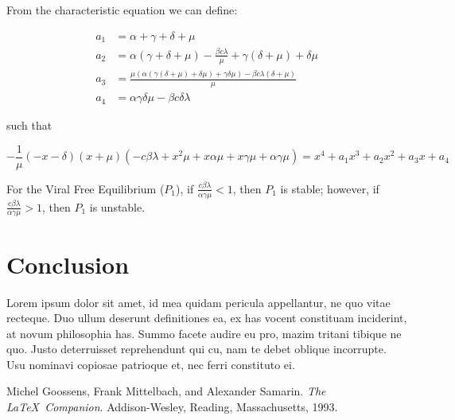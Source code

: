 \documentclass{article}
\begin{document}
From the characteristic equation we can define:

\begin{equation}
	\begin{split}
		a_{1} &= \alpha + \gamma + \delta + \mu \\
		a_{2} &= \alpha (\gamma + \delta + \mu) - \frac{\beta c \lambda}{\mu} + \gamma (\delta + \mu) + \delta \mu \\
		a_{3} &= \frac{\mu (\alpha (\gamma (\delta + \mu) + \delta \mu) + \gamma \delta \mu ) - \beta c \lambda (\delta + \mu)}{\mu} \\
		a_{4} &= \alpha \gamma \delta \mu - \beta c \delta \lambda
	\end{split}
\end{equation}

such that

\begin{equation}
	- \frac{1}{\mu}(-x - \delta)(x + \mu)(-c \beta \lambda + x^2 \mu + x \alpha \mu + x\gamma \mu + \alpha \gamma \mu) = x^4 + a_{1}x^3 + a_{2}x^2 + a_{3}x + a_{4}
\end{equation}

For the Viral Free Equilibrium ($P_{1}$), if $\frac{c \beta \lambda}{\alpha \gamma \mu} < 1$, then $P_{1}$ is stable; however, if $\frac{c \beta \lambda}{\alpha \gamma \mu} > 1$, then $P_{1}$ is unstable.


\section{Conclusion}
\label{sub:Conclusion}
Lorem ipsum dolor sit amet, id mea quidam pericula appellantur, ne quo vitae recteque. Duo ullum deserunt definitiones ea, ex has vocent constituam inciderint, at novum philosophia has. Summo facete audire eu pro, mazim tritani tibique ne quo. Justo deterruisset reprehendunt qui cu, nam te debet oblique incorrupte. Usu nominavi copiosae patrioque et, nec ferri constituto ei.



\begin{thebibliography}{9}
Michel Goossens, Frank Mittelbach, and Alexander Samarin. 
\textit{The \LaTeX\ Companion}. 
Addison-Wesley, Reading, Massachusetts, 1993.
\end{thebibliography}
\end{document}
